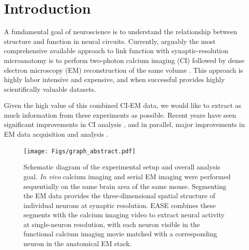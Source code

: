 \documentclass[10pt,letterpaper]{article}
\begin{document}
\linenumbers




\section{Introduction}

A fundamental goal of neuroscience is to understand the relationship between structure and function in neural circuits.  Currently, arguably the most comprehensive available approach to link function with synaptic-resolution microanatomy is to perform two-photon calcium imaging (CI) followed by dense electron microscopy (EM) reconstruction of the same volume  \citep{Briggman2011,Bock2011,Lee2016,Vishwanathan2017,Hildebrand2017}.  This approach is  
highly labor intensive and expensive, and when successful provides highly scientifically valuable datasets.

Given the high value of this combined CI-EM data, we would like to extract as much information from these experiments as possible.  Recent years have seen significant improvements in CI analysis \citep{Mukamel2009,Pnevmatikakis2016, Pachitariu2016, Friedrich2017a, Friedrich2017b, Petersen2018, Zhou2018, Buchanan2018, Soltanian2019}, and in parallel, major improvements in EM data acquisition and analysis \citep{Helmstaedter2013, Kim2014, Kasthuri2015,Hayworth2015, Morgan2016, Ding2016, Zheng2017,Takemura2017, Januszewski2018}. 


\begin{figure}[t!]
	\centering
	\texttt{[image: Figs/graph\_abstract.pdf]}
	\caption{Schematic diagram of the experimental setup and overall analysis goal. \textit{In vivo} calcium imaging and serial EM imaging were performed sequentially on the same brain area of the same mouse. Segmenting the EM data provides the three-dimensional spatial structure of individual neurons at synaptic resolution. EASE combines these segments with the calcium imaging video to extract neural activity at single-neuron resolution, with each neuron visible in the functional calcium imaging movie matched with a corresponding neuron in the anatomical EM stack. } 
	\label{fig:abstract}
\end{figure}
\end{document}
